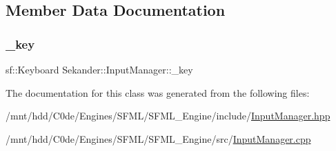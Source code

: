 \subsection{Member Data Documentation}
\mbox{\label{classSekander_1_1InputManager_aea65e79014e4b92dbce7fefae50b0022}} 
\subsubsection{\texorpdfstring{\+\_\+key}{\_key}}
{\footnotesize\ttfamily sf\+::\+Keyboard Sekander\+::\+Input\+Manager\+::\+\_\+key\hspace{0.3cm}{\ttfamily [private]}}



The documentation for this class was generated from the following files\+:\begin{DoxyCompactItemize}
\item 
/mnt/hdd/\+C0de/\+Engines/\+S\+F\+M\+L/\+S\+F\+M\+L\+\_\+\+Engine/include/\hyperlink{InputManager_8hpp}{Input\+Manager.\+hpp}\item 
/mnt/hdd/\+C0de/\+Engines/\+S\+F\+M\+L/\+S\+F\+M\+L\+\_\+\+Engine/src/\hyperlink{InputManager_8cpp}{Input\+Manager.\+cpp}\end{DoxyCompactItemize}
